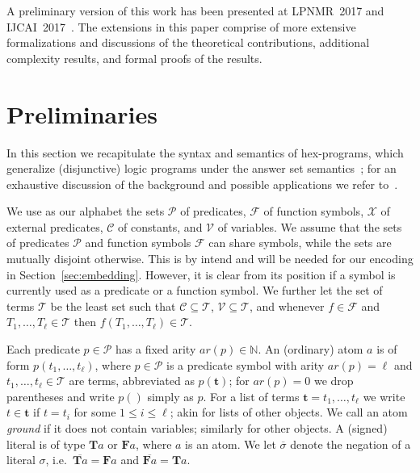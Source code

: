 \documentclass[11pt,fleqn,twoside]{article}
\renewcommand{\vec}[1]{\ensuremath{\mb{#1}}}
\newcommand{\mb}[1]{\ensuremath{\mathbf{#1}}}
\newcommand\hex{{\sc hex}\xspace}
\newcommand{\T}{\mathbf{T}}
\newcommand{\F}{\mathbf{F}}
\begin{document}
		A preliminary version of this work has been presented at LPNMR~2017 and IJCAI~2017~\cite{r2017a-lpnmr,r2017b-lpnmr,r2017-ijcai}.
		The extensions in this paper comprise of more extensive formalizations and discussions of the theoretical contributions,
		additional complexity results, and formal proofs of the results.

	\section{Preliminaries}
	\label{sec:prelim}

		In this section we recapitulate the syntax and semantics of \hex-programs, which
		generalize (disjunctive) logic programs under the answer set
		semantics~\cite{gelf-lifs-91}; for an exhaustive discussion of the background and possible applications we refer to~.

		We use as our alphabet the sets
		$\mathcal{P}$ of predicates, $\mathcal{F}$ of function symbols, $\mathcal{X}$ of external predicates, $\mathcal{C}$ of constants, and $\mathcal{V}$ of variables.
		We assume that the sets of predicates $\mathcal{P}$ and function symbols $\mathcal{F}$
		can share symbols, while the sets are mutually disjoint otherwise.
		This is by intend and will be needed for our encoding in Section~\ref{sec:embedding}.
		However, it is clear from its position if a symbol is currently used as a predicate or a function symbol.
		We further let the set of terms $\mathcal{T}$ be the least set such that
		$\mathcal{C} \subseteq \mathcal{T}$,
		$\mathcal{V} \subseteq \mathcal{T}$,
		and whenever $f \in \mathcal{F}$ and $T_1, \ldots, T_\ell \in \mathcal{T}$ then $f(T_1, \ldots, T_\ell) \in \mathcal{T}$.

		Each predicate $p \in \mathcal{P}$ has a fixed arity $\mathit{ar}(p) \in \mathbb{N}$.
		An (ordinary) atom $a$ is of form $p(t_1, \dotsc, t_\ell)$,
		where $p \in \mathcal{P}$ is a predicate symbol with arity $\mathit{ar}(p) = \ell$ and
		$t_1, \dotsc, t_\ell \in \mathcal{T}$ are terms,
		abbreviated as $p(\vec{t})$;
		for $\mathit{ar}(p) = 0$ we drop parentheses and write $p()$ simply as $p$.
		For a list of terms $\vec{t} = t_1, \ldots, t_\ell$
		we write $t \in \vec{t}$ if $t = t_i$ for some $1 \le i \le \ell$; akin for lists of other objects.
		We call an atom \emph{ground} if it does not contain variables; similarly for other objects.
		A (signed) literal is of type $\T a$ or $\F a$, where $a$ is an atom.
		We let $\overline{\sigma}$ denote the negation of a
		literal $\sigma$, i.e.\ $\overline{\T a} = \F a$ and $\overline{\F a} = \T a$.
		
\end{document}
